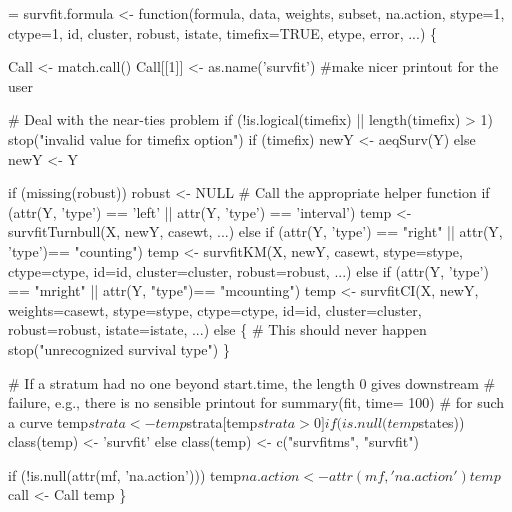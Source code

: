 \documentclass{article}
\begin{document}
\begin{nwchunk}
=
 survfit.formula <- function(formula, data, weights, subset, 
                             na.action, stype=1, ctype=1, 
                             id, cluster, robust, istate, 
                             timefix=TRUE, etype, error, ...) \{
 
     Call <- match.call()
     Call[[1]] <- as.name('survfit')  #make nicer printout for the user
                          
     # Deal with the near-ties problem
     if (!is.logical(timefix) || length(timefix) > 1)
         stop("invalid value for timefix option")
     if (timefix) newY <- aeqSurv(Y) else newY <- Y
     
     if (missing(robust)) robust <- NULL
     # Call the appropriate helper function
     if (attr(Y, 'type') == 'left' || attr(Y, 'type') == 'interval')
         temp <-  survfitTurnbull(X, newY, casewt, ...)
     else if (attr(Y, 'type') == "right" || attr(Y, 'type')== "counting")
         temp <- survfitKM(X, newY, casewt, stype=stype, ctype=ctype, id=id, 
                           cluster=cluster, robust=robust, ...)
     else if (attr(Y, 'type') == "mright" || attr(Y, "type")== "mcounting")
         temp <- survfitCI(X, newY, weights=casewt, stype=stype, ctype=ctype, 
                           id=id, cluster=cluster, robust=robust, 
                           istate=istate, ...)
     else \{
         # This should never happen
         stop("unrecognized survival type")
     \}
 
     # If a stratum had no one beyond start.time, the length 0 gives downstream
     #  failure, e.g., there is no sensible printout for summary(fit, time= 100)
     #  for such a curve
     temp$strata <- temp$strata[temp$strata >0]  
     if (is.null(temp$states)) class(temp) <- 'survfit'
     else class(temp) <- c("survfitms", "survfit")
 
     if (!is.null(attr(mf, 'na.action')))
             temp$na.action <- attr(mf, 'na.action')
 
     temp$call <- Call
     temp
     \}
\end{nwchunk}
\end{document}
